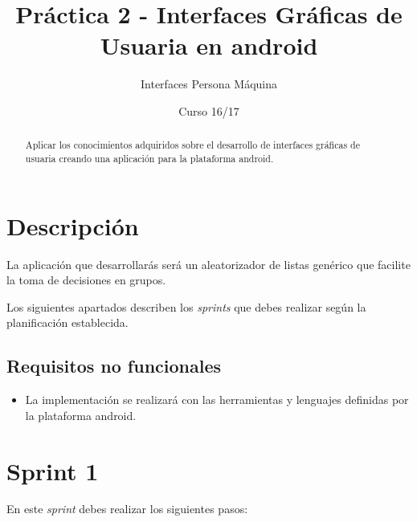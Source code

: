 \documentclass[11pt,a4paper]{article}
\title{Práctica 2 - Interfaces Gráficas de Usuaria en android}
\author{Interfaces Persona Máquina}
\date{Curso 16/17}
\begin{document}
\maketitle

\begin{abstract}
  Aplicar los conocimientos adquiridos sobre el desarrollo de
  interfaces gráficas de usuaria creando una aplicación para la
  plataforma android.
\end{abstract}


\section{Descripción}

La aplicación que desarrollarás será un aleatorizador de listas
genérico que facilite la toma de decisiones en grupos.

Los siguientes apartados describen los \emph{sprints} que debes
realizar según la planificación establecida.


\subsection{Requisitos no funcionales}
\begin{itemize}
\item La implementación se realizará con las herramientas y lenguajes
  definidas por la plataforma android.
\end{itemize}


\section{Sprint 1}

En este \emph{sprint} debes realizar los siguientes pasos:
\end{document}
